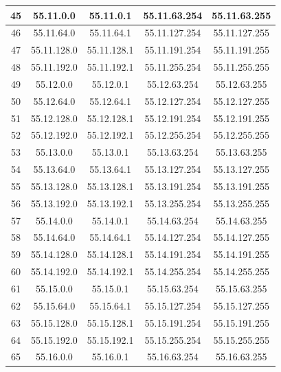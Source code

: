 \documentclass[letterpaper,12pt]{article}
\begin{document}
\begin{center}
\begin{longtable}{|c|c|c|c|c|}
                45 & 55.11.0.0 & 55.11.0.1 & 55.11.63.254 & 55.11.63.255 \\ \hline
                46 & 55.11.64.0 & 55.11.64.1 & 55.11.127.254 & 55.11.127.255 \\ \hline
                47 & 55.11.128.0 & 55.11.128.1 & 55.11.191.254 & 55.11.191.255 \\ \hline
                48 & 55.11.192.0 & 55.11.192.1 & 55.11.255.254 & 55.11.255.255 \\ \hline
                49 & 55.12.0.0 & 55.12.0.1 & 55.12.63.254 & 55.12.63.255 \\ \hline
                50 & 55.12.64.0 & 55.12.64.1 & 55.12.127.254 & 55.12.127.255 \\ \hline
                51 & 55.12.128.0 & 55.12.128.1 & 55.12.191.254 & 55.12.191.255 \\ \hline
                52 & 55.12.192.0 & 55.12.192.1 & 55.12.255.254 & 55.12.255.255 \\ \hline
                53 & 55.13.0.0 & 55.13.0.1 & 55.13.63.254 & 55.13.63.255 \\ \hline
                54 & 55.13.64.0 & 55.13.64.1 & 55.13.127.254 & 55.13.127.255 \\ \hline
                55 & 55.13.128.0 & 55.13.128.1 & 55.13.191.254 & 55.13.191.255 \\ \hline
                56 & 55.13.192.0 & 55.13.192.1 & 55.13.255.254 & 55.13.255.255 \\ \hline
                57 & 55.14.0.0 & 55.14.0.1 & 55.14.63.254 & 55.14.63.255 \\ \hline
                58 & 55.14.64.0 & 55.14.64.1 & 55.14.127.254 & 55.14.127.255 \\ \hline
                59 & 55.14.128.0 & 55.14.128.1 & 55.14.191.254 & 55.14.191.255 \\ \hline
                60 & 55.14.192.0 & 55.14.192.1 & 55.14.255.254 & 55.14.255.255 \\ \hline
                61 & 55.15.0.0 & 55.15.0.1 & 55.15.63.254 & 55.15.63.255 \\ \hline
                62 & 55.15.64.0 & 55.15.64.1 & 55.15.127.254 & 55.15.127.255 \\ \hline
                63 & 55.15.128.0 & 55.15.128.1 & 55.15.191.254 & 55.15.191.255 \\ \hline
                64 & 55.15.192.0 & 55.15.192.1 & 55.15.255.254 & 55.15.255.255 \\ \hline
                65 & 55.16.0.0 & 55.16.0.1 & 55.16.63.254 & 55.16.63.255 \\ \hline

\end{longtable}
\end{center}
\end{document}
